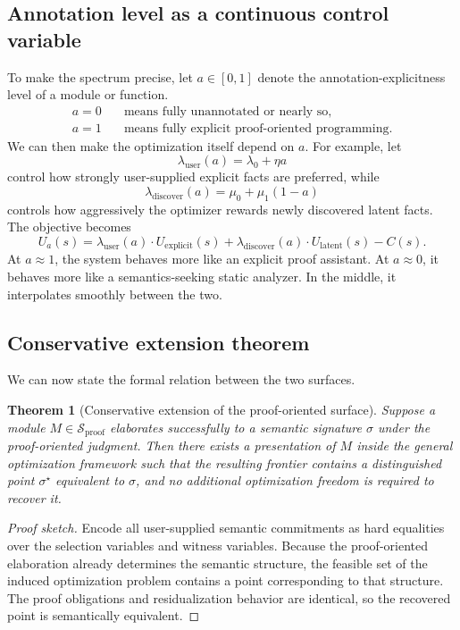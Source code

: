\documentclass[11pt]{article}
\theoremstyle{definition}
\theoremstyle{plain}
\newtheorem{theorem}[definition]{Theorem}
\begin{document}
\subsection{Annotation level as a continuous control variable}
To make the spectrum precise, let $a \in [0,1]$ denote the annotation-explicitness
level of a module or function.
\begin{align*}
a = 0 &\quad\text{means fully unannotated or nearly so}, \\
a = 1 &\quad\text{means fully explicit proof-oriented programming.}
\end{align*}
We can then make the optimization itself depend on $a$. For example, let
\[
\lambda_{\mathrm{user}}(a) = \lambda_0 + \eta a
\]
control how strongly user-supplied explicit facts are preferred, while
\[
\lambda_{\mathrm{discover}}(a) = \mu_0 + \mu_1 (1-a)
\]
controls how aggressively the optimizer rewards newly discovered latent facts.
The objective becomes
\[
U_a(s)
= \lambda_{\mathrm{user}}(a) \cdot U_{\mathrm{explicit}}(s)
+ \lambda_{\mathrm{discover}}(a) \cdot U_{\mathrm{latent}}(s)
- C(s).
\]
At $a \approx 1$, the system behaves more like an explicit proof assistant. At
$a \approx 0$, it behaves more like a semantics-seeking static analyzer. In the
middle, it interpolates smoothly between the two.

\subsection{Conservative extension theorem}
We can now state the formal relation between the two surfaces.

\begin{theorem}[Conservative extension of the proof-oriented surface]
Suppose a module $M \in \mathcal{S}_{\mathrm{proof}}$ elaborates successfully to a
semantic signature $\sigma$ under the proof-oriented judgment. Then there exists a
presentation of $M$ inside the general optimization framework such that the
resulting frontier contains a distinguished point $\sigma^\star$ equivalent to
$\sigma$, and no additional optimization freedom is required to recover it.
\end{theorem}

\begin{proof}[Proof sketch]
Encode all user-supplied semantic commitments as hard equalities over the
selection variables and witness variables. Because the proof-oriented elaboration
already determines the semantic structure, the feasible set of the induced
optimization problem contains a point corresponding to that structure. The proof
obligations and residualization behavior are identical, so the recovered point is
semantically equivalent.
\end{proof}
\end{document}
